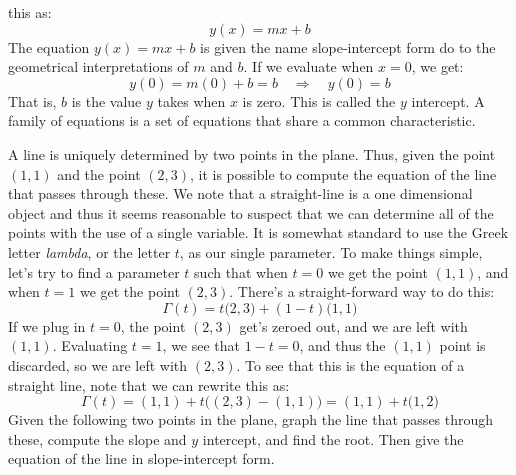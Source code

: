 \documentclass[crop=false,class=book,oneside]{standalone}                      %
\begin{document}
            this as:
            \begin{equation}
                y(x)=mx+b
            \end{equation}
            The equation $y(x)=mx+b$ is given the name slope-intercept form do
            to the geometrical interpretations of $m$ and $b$. If we evaluate
            when $x=0$, we get:
            \begin{equation}
                y(0)=m(0)+b=b
                \quad\Longrightarrow\quad
                y(0)=b
            \end{equation}
            That is, $b$ is the value $y$ takes when $x$ is zero. This is
            called the $y$ intercept.
            A family of equations is a set of equations that share a
            common characteristic.
            \begin{lexample}
                A line is uniquely determined by two points in the plane.
                Thus, given the point $(1,1)$ and the point $(2,3)$, it is
                possible to compute the equation of the line that passes through
                these. We note that a straight-line is a one dimensional object
                and thus it seems reasonable to suspect that we can determine
                all of the points with the use of a single variable. It is
                somewhat standard to use the Greek letter \textit{lambda}, or
                the letter $t$, as our single parameter. To make things simple,
                let's try to find a parameter $t$ such that when $t=0$ we get
                the point $(1,1)$, and when $t=1$ we get the point $(2,3)$.
                There's a straight-forward way to do this:
                \begin{equation}
                    \Gamma(t)=t\big(2,3\big)+(1-t)\big(1,1\big)
                \end{equation}
                If we plug in $t=0$, the point $(2,3)$ get's zeroed out, and
                we are left with $(1,1)$. Evaluating $t=1$, we see that
                $1-t=0$, and thus the $(1,1)$ point is discarded, so we are
                left with $(2,3)$. To see that this is the equation of a
                straight line, note that we can rewrite this as:
                \begin{equation}
                    \Gamma(t)=(1,1)+t\big((2,3)-(1,1)\big)
                             =(1,1)+t\big(1,2\big)
                \end{equation}
                Given the following two points in the plane,
                graph the line that passes through these, compute
                the slope and $y$ intercept, and find the root.
                Then give the equation of the line in slope-intercept
                form.
            \end{lexample}
\end{document}

